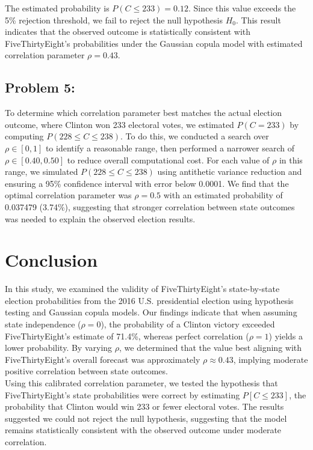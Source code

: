 \documentclass{report}
\begin{document}
The estimated probability is $P(C \leq 233) = 0.12$. Since this value exceeds the 5\% rejection threshold, we fail to reject the null hypothesis $H_0$. This result indicates that the observed outcome is statistically consistent with FiveThirtyEight's probabilities under the Gaussian copula model with estimated correlation parameter $\rho = 0.43$.

\subsection*{Problem 5:}
To determine which correlation parameter best matches the actual election outcome, where Clinton won 233 electoral votes, we estimated $P(C = 233)$ by computing $P(228 \leq C \leq 238)$. To do this, we conducted a search over $\rho \in [0, 1]$ to identify a reasonable range, then performed a narrower search of $\rho \in [0.40, 0.50]$ to reduce overall computational cost. For each value of $\rho$ in this range, we simulated $P(228 \leq C \leq 238)$ using antithetic variance reduction and ensuring a 95\% confidence interval with error below 0.0001. We find that the optimal correlation parameter was $\rho = 0.5$ with an estimated probability of 0.037479 (3.74\%), suggesting that stronger correlation between state outcomes was needed to explain the observed election results.



\section*{Conclusion}
In this study, we examined the validity of FiveThirtyEight's state-by-state election probabilities from the 2016 U.S. presidential election using hypothesis testing and Gaussian copula models. Our findings indicate that when assuming state independence ($\rho = 0$), the probability of a Clinton victory exceeded FiveThirtyEight’s estimate of 71.4\%, whereas perfect correlation ($\rho = 1$) yields a lower probability. By varying $\rho$, we determined that the value best aligning with FiveThirtyEight’s overall forecast was approximately $\rho \approx 0.43$, implying moderate positive correlation between state outcomes.  \\ 

Using this calibrated correlation parameter, we tested the hypothesis that FiveThirtyEight’s state probabilities were correct by estimating $P[C \leq 233]$, the probability that Clinton would win 233 or fewer electoral votes. The results suggested we could not reject the null hypothesis, suggesting that the model remains statistically consistent with the observed outcome under moderate correlation.
\end{document}
